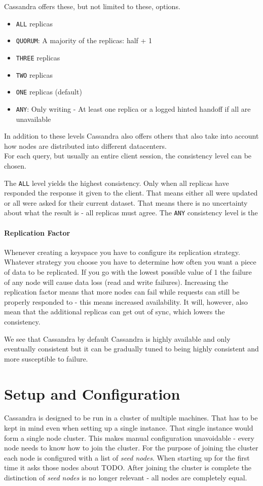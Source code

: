 Cassandra offers these, but not limited to these, options.

\begin{itemize}
  \item \texttt{ALL} replicas
  \item \texttt{QUORUM}: A majority of the replicas: half + 1
  \item \texttt{THREE} replicas
  \item \texttt{TWO} replicas
  \item \texttt{ONE} replicas (default)
  \item \texttt{ANY}: Only writing - At least one replica or a logged hinted handoff if all are unavailable
\end{itemize}

In addition to these levels Cassandra also offers others that also take into account how nodes are distributed into different datacenters. \\
For each query, but usually an entire client session, the consistency level can be chosen.

The \texttt{ALL} level yields the highest consistency. Only when all replicas have responded the response it given to the client. That means either all were updated or all were asked for their current dataset. That means there is no uncertainty about what the result is - all replicas must agree. The \texttt{ANY} consistency level is the

\paragraph{Replication Factor} Whenever creating a keyspace you have to configure its replication strategy. Whatever strategy you choose you have to determine how often you want a piece of data to be replicated. If you go with the lowest possible value of 1 the failure of any node will cause data loss (read and write failures). Increasing the replication factor means that more nodes can fail while requests can still be properly responded to - this means increased availability. It will, however, also mean that the additional replicas can get out of sync, which lowers the consistency.

We see that Cassandra by default Cassandra is highly available and only eventually consistent but it can be gradually tuned to being highly consistent and more susceptible to failure.

\section{Setup and Configuration}  %
Cassandra is designed to be run in a cluster of multiple machines. That has to be kept in mind even when setting up a single instance. That single instance would form a single node cluster. This makes manual configuration unavoidable - every node needs to know how to join the cluster.
For the purpose of joining the cluster each node is configured with a list of \textit{seed nodes}. When starting up for the first time it asks those nodes about TODO. After joining the cluster is complete the distinction of \textit{seed nodes} is no longer relevant - all nodes are completely equal.

